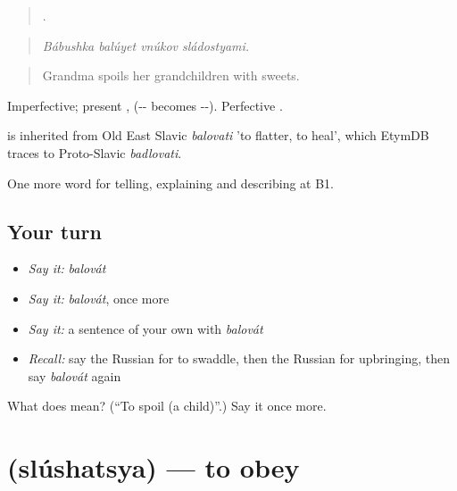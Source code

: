 \begin{quote}
   .
\end{quote}

\begin{quote}
\emph{Bábushka balúyet vnúkov sládostyami.}
\end{quote}

\begin{quote}
Grandma spoils her grandchildren with sweets.
\end{quote}

Imperfective; present ,  (-- becomes --). Perfective .

\begin{cousinweb}
\emph{} is inherited from Old East Slavic \emph{balovati} 'to flatter, to heal', which EtymDB traces to Proto-Slavic \emph{badlovati}.
\end{cousinweb}

\begin{grammarlens}[title={What you've built}]
One more word for telling, explaining and describing at B1.
\end{grammarlens}

\subsection*{Your turn}
\begin{itemize}
\raggedright
  \item \emph{Say it:} \emph{balovát}
  \item \emph{Say it:} \emph{balovát}, once more
  \item \emph{Say it:} a sentence of your own with \emph{balovát}
  \item \emph{Recall:} say the Russian for to swaddle, then the Russian for upbringing, then say \emph{balovát} again
\end{itemize}

\begin{tcolorbox}[breakable,colback=teal!4,colframe=teal!35!black,title={Before you move on}]
What does  mean? (\textquotedblleft{}To spoil (a child)\textquotedblright{}.) Say it once more.
\end{tcolorbox}
\section[\texorpdfstring{\ru{слушаться} (slúshatsya)}{слушаться (slúshatsya)}]{ (slúshatsya) — to obey}

